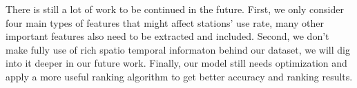 \documentclass[runningheads]{llncs}
\begin{document}
There is still a lot of work to be continued in the future. First, we only consider four main types of features that might affect stations' use rate, many other important features also need to be extracted and included. Second, we don't make fully use of rich spatio temporal informaton behind our dataset, we will dig into it deeper in our future work. Finally, our model still needs optimization and apply a more useful ranking algorithm to get better accuracy and ranking results.
%
%
%
% 
% 
%


\end{document}
